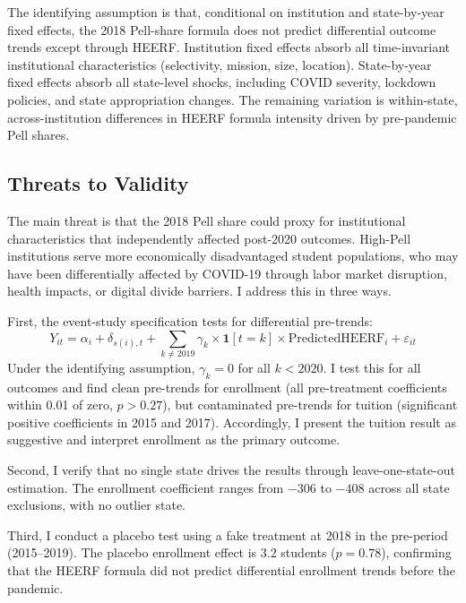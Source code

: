 \documentclass[12pt]{article}
\begin{document}
The identifying assumption is that, conditional on institution and state-by-year fixed effects, the 2018 Pell-share formula does not predict differential outcome trends except through HEERF. Institution fixed effects absorb all time-invariant institutional characteristics (selectivity, mission, size, location). State-by-year fixed effects absorb all state-level shocks, including COVID severity, lockdown policies, and state appropriation changes. The remaining variation is within-state, across-institution differences in HEERF formula intensity driven by pre-pandemic Pell shares.

\subsection{Threats to Validity}

The main threat is that the 2018 Pell share could proxy for institutional characteristics that independently affected post-2020 outcomes. High-Pell institutions serve more economically disadvantaged student populations, who may have been differentially affected by COVID-19 through labor market disruption, health impacts, or digital divide barriers. I address this in three ways.

First, the event-study specification tests for differential pre-trends:
\begin{equation}
Y_{it} = \alpha_i + \delta_{s(i),t} + \sum_{k \neq 2019} \gamma_k \times \mathbf{1}[t = k] \times \text{PredictedHEERF}_i + \varepsilon_{it}
\label{eq:event}
\end{equation}
Under the identifying assumption, $\gamma_k = 0$ for all $k < 2020$. I test this for all outcomes and find clean pre-trends for enrollment (all pre-treatment coefficients within 0.01 of zero, $p > 0.27$), but contaminated pre-trends for tuition (significant positive coefficients in 2015 and 2017). Accordingly, I present the tuition result as suggestive and interpret enrollment as the primary outcome.

Second, I verify that no single state drives the results through leave-one-state-out estimation. The enrollment coefficient ranges from $-306$ to $-408$ across all state exclusions, with no outlier state.

Third, I conduct a placebo test using a fake treatment at 2018 in the pre-period (2015--2019). The placebo enrollment effect is 3.2 students ($p = 0.78$), confirming that the HEERF formula did not predict differential enrollment trends before the pandemic.
\end{document}
